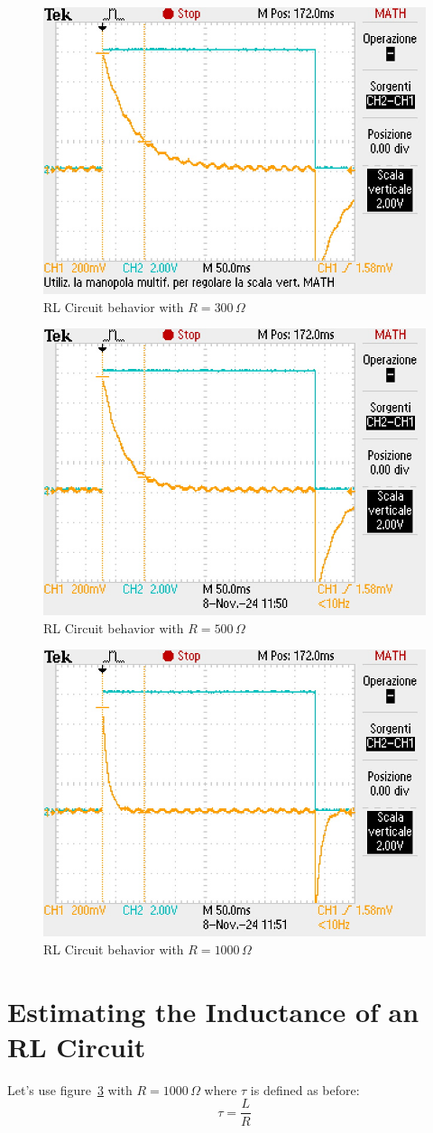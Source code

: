 \documentclass[notitlepage]{report}
\numberwithin{equation}{section}
\theoremstyle{plain}
\theoremstyle{definition}
\theoremstyle{remark}
\begin{document}
\begin{figure}[h!]
    \centering
    \includegraphics[width=0.4\linewidth]{figures/RL_graph_1.JPG}
    \caption{RL Circuit behavior with \(R = 300 \, \Omega\)}
    \label{fig:RL_1}
\end{figure}

\begin{figure}[h!]
    \centering
    \includegraphics[width=0.4\linewidth]{figures/RL_graph_2.JPG}
    \caption{RL Circuit behavior with \(R = 500 \, \Omega\)}
    \label{fig:RL_2}
\end{figure}

\begin{figure}[h!]
    \centering
    \includegraphics[width=0.4\linewidth]{figures/RL_graph_3.JPG}
    \caption{RL Circuit behavior with \(R = 1000 \, \Omega\)}
    \label{fig:RL_4}
\end{figure}

\section*{Estimating the Inductance of an RL Circuit}

Let's use figure~\ref{fig:RL_4} with \( R = 1000 \, \Omega \) where \( \tau \) is defined as before:
\[
\tau = \frac{L}{R}
\]
\end{document}
